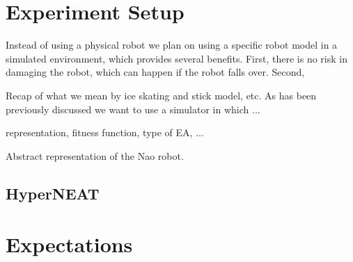 \documentclass[10pt]{article}
\begin{document}

\section{Experiment Setup}
Instead of using a physical robot we plan on using a specific robot model in a simulated environment, which provides several benefits. First, there is no risk in damaging the robot, which can happen if the robot falls over. Second, 

Recap of what we mean by ice skating and stick model, etc.
As has been previously discussed we want to use a simulator in which ...

representation, fitness function,
type of EA, ...

Abstract representation of the Nao robot.

\subsection{HyperNEAT}

\section{Expectations}



\end{document}
